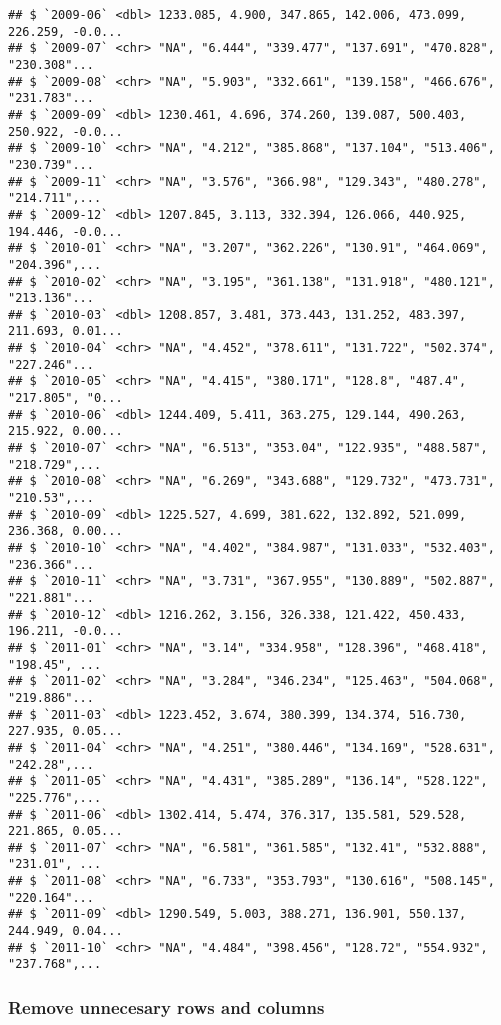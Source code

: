 \documentclass[]{article}
\begin{document}
\begin{verbatim}
## $ `2009-06` <dbl> 1233.085, 4.900, 347.865, 142.006, 473.099, 226.259, -0.0...
## $ `2009-07` <chr> "NA", "6.444", "339.477", "137.691", "470.828", "230.308"...
## $ `2009-08` <chr> "NA", "5.903", "332.661", "139.158", "466.676", "231.783"...
## $ `2009-09` <dbl> 1230.461, 4.696, 374.260, 139.087, 500.403, 250.922, -0.0...
## $ `2009-10` <chr> "NA", "4.212", "385.868", "137.104", "513.406", "230.739"...
## $ `2009-11` <chr> "NA", "3.576", "366.98", "129.343", "480.278", "214.711",...
## $ `2009-12` <dbl> 1207.845, 3.113, 332.394, 126.066, 440.925, 194.446, -0.0...
## $ `2010-01` <chr> "NA", "3.207", "362.226", "130.91", "464.069", "204.396",...
## $ `2010-02` <chr> "NA", "3.195", "361.138", "131.918", "480.121", "213.136"...
## $ `2010-03` <dbl> 1208.857, 3.481, 373.443, 131.252, 483.397, 211.693, 0.01...
## $ `2010-04` <chr> "NA", "4.452", "378.611", "131.722", "502.374", "227.246"...
## $ `2010-05` <chr> "NA", "4.415", "380.171", "128.8", "487.4", "217.805", "0...
## $ `2010-06` <dbl> 1244.409, 5.411, 363.275, 129.144, 490.263, 215.922, 0.00...
## $ `2010-07` <chr> "NA", "6.513", "353.04", "122.935", "488.587", "218.729",...
## $ `2010-08` <chr> "NA", "6.269", "343.688", "129.732", "473.731", "210.53",...
## $ `2010-09` <dbl> 1225.527, 4.699, 381.622, 132.892, 521.099, 236.368, 0.00...
## $ `2010-10` <chr> "NA", "4.402", "384.987", "131.033", "532.403", "236.366"...
## $ `2010-11` <chr> "NA", "3.731", "367.955", "130.889", "502.887", "221.881"...
## $ `2010-12` <dbl> 1216.262, 3.156, 326.338, 121.422, 450.433, 196.211, -0.0...
## $ `2011-01` <chr> "NA", "3.14", "334.958", "128.396", "468.418", "198.45", ...
## $ `2011-02` <chr> "NA", "3.284", "346.234", "125.463", "504.068", "219.886"...
## $ `2011-03` <dbl> 1223.452, 3.674, 380.399, 134.374, 516.730, 227.935, 0.05...
## $ `2011-04` <chr> "NA", "4.251", "380.446", "134.169", "528.631", "242.28",...
## $ `2011-05` <chr> "NA", "4.431", "385.289", "136.14", "528.122", "225.776",...
## $ `2011-06` <dbl> 1302.414, 5.474, 376.317, 135.581, 529.528, 221.865, 0.05...
## $ `2011-07` <chr> "NA", "6.581", "361.585", "132.41", "532.888", "231.01", ...
## $ `2011-08` <chr> "NA", "6.733", "353.793", "130.616", "508.145", "220.164"...
## $ `2011-09` <dbl> 1290.549, 5.003, 388.271, 136.901, 550.137, 244.949, 0.04...
## $ `2011-10` <chr> "NA", "4.484", "398.456", "128.72", "554.932", "237.768",...
\end{verbatim}

\hypertarget{remove-unnecesary-rows-and-columns}{%
\subsubsection{Remove unnecesary rows and
columns}\label{remove-unnecesary-rows-and-columns}}
\end{document}
